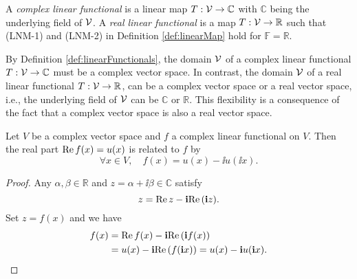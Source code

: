 \begin{defn}
  \label{def:linearFunctionals}
  A \emph{complex linear functional} is
  a linear map $T: {\cal V}\rightarrow \mathbb{C}$
  with $\mathbb{C}$ being the underlying field of ${\cal V}$. 
  A \emph{real linear functional}
  is a map $T: {\cal V}\rightarrow \mathbb{R}$
  such that (LNM-1) and (LNM-2) in Definition \ref{def:linearMap}
  hold for $\mathbb{F}=\mathbb{R}$.
\end{defn}

\begin{rem}
  By Definition \ref{def:linearFunctionals},
  the domain ${\cal V}$ of a complex linear functional $T: {\cal V}\rightarrow \mathbb{C}$
  must be a complex vector space. 
  In contrast,
  the domain ${\cal V}$ of a real linear functional
  $T: {\cal V}\rightarrow \mathbb{R}$, 
  can be a complex vector space
  or a real vector space,
  i.e., the underlying field of ${\cal V}$
  can be $\mathbb{C}$ or $\mathbb{R}$.
  This flexibility is a consequence of the fact
  that a complex vector space is also a real vector space.
\end{rem}

\begin{lem}
  \label{lem:complexLinearFuncRealPart}
  Let $V$ be a complex vector space
  and $f$ a complex linear functional on $V$.
  Then the real part $\mathrm{Re}\, f (x) = u(x)$ is related to $f$
  by
  \begin{equation}
    \label{eq:complexLinearFuncRealPart}
    \forall x\in V, \quad f(x) = u(x) - \ii u(\ii x).
  \end{equation}
\end{lem}
\begin{proof}
  Any $\alpha,\beta\in \mathbb{R}$
  and $z=\alpha+\ii \beta\in \mathbb{C}$ satisfy
  \begin{displaymath}
    z = \mathrm{Re}\, z - \mathbf{i} \mathrm{Re}\, (\mathbf{i} z).
  \end{displaymath}
  Set $z=f(x)$ and we have
  \begin{align*}
    f(x) &= \mathrm{Re}\, f(x) - \mathbf{i} \mathrm{Re}\, (\mathbf{i} f(x))
    \\
    &= u(x) - \mathbf{i} \mathrm{Re}\, (f(\mathbf{i} x))
    = u(x) - \mathbf{i} u(\mathbf{i} x). \qedhere
  \end{align*}
\end{proof}

